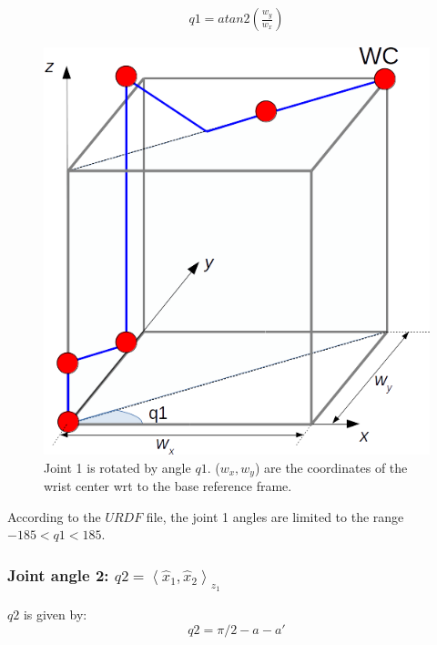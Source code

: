 \documentclass[a4paper,12pt]{report}
\begin{document}
\begin{align}
q1 = atan2 \left(\frac{w_y}{w_x} \right)
\end{align}

\begin{figure}[H]
\centering
        \includegraphics[totalheight=7cm]{imgs/q1.png}
        \caption{Joint 1 is rotated by angle $q1$. ($w_x, w_y$) are the coordinates of the wrist center wrt to the base reference frame.}
        \label{fig:q1}
\end{figure}

According to the $URDF$ file, the joint 1 angles are limited to the  range $-185 < q1 < 185$.

\subsubsection{Joint angle 2: $q2 = \left< \hat{x}_1, \hat{x}_2 \right> _{z_1} $}

$q2$ is given by:
\begin{equation}
\label{eq:eq10}
q2 = \pi/2 - a - a'
\end{equation}
\end{document}
